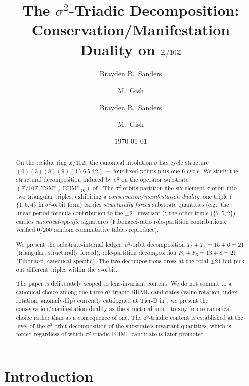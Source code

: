 \documentclass[11pt,reqno]{amsart}
\title[$\sigma^{2}$-Triadic Decomposition on $\Z/10\Z$]
{The $\sigma^{2}$-Triadic Decomposition: \\
 Conservation/Manifestation Duality on $\Z/10\Z$}
\author{Brayden R.\ Sanders \and M.\ Gish}
\author{Brayden R.\ Sanders \and M.\ Gish}
\date{\today}
\theoremstyle{plain}
\theoremstyle{definition}
\theoremstyle{remark}
\newcommand{\Z}{\mathbb{Z}}
\newcommand{\TS}{\mathrm{TSML}}
\newcommand{\BH}{\mathrm{BHML}}
\newcommand{\sig}{\sigma}
\begin{document}
\begin{abstract}
On the residue ring $\Z/10\Z$, the canonical involution $\sig$ has cycle
structure $(0)(3)(8)(9)(1\,7\,6\,5\,4\,2)$ --- four fixed points plus
one $6$-cycle. We study the structural decomposition induced by
$\sig^{2}$ on the operator substrate $(\Z/10\Z, \TS_{8}, \BH_{10})$ of
\cite{SandersGishFourCore}. The $\sig^{2}$-orbits partition the
six-element $\sig$-orbit into two triangular triples, exhibiting a
\emph{conservation/manifestation duality}: one triple
($\{1, 6, 4\}$ in $\sig^{2}$-orbit form) carries
\emph{structurally forced} substrate quantities (e.g., the linear
period-formula contribution to the $\pm 21$ invariant
\cite{SandersBridgeWP9}); the other triple ($\{7, 5, 2\}$) carries
\emph{canonical-specific} signatures (Fibonacci-ratio role-partition
contributions; verified $0/200$ random commutative tables reproduce).

We present the substrate-internal ledger: $\sig^{2}$-orbit
decomposition $T_{5} + T_{3} = 15 + 6 = 21$ (triangular, structurally
forced); role-partition decomposition $F_{7} + F_{6} = 13 + 8 = 21$
(Fibonacci, canonical-specific). The two decompositions cross at the
total $\pm 21$ but pick out different triples within the $\sig$-orbit.

The paper is deliberately scoped to lens-invariant content. We do not
commit to a canonical choice among the three σ²-triadic BHML candidates
(value-rotation, index-rotation, anomaly-flip) currently catalogued at
Tier-D in \cite{Atlas2026Tiering}; we present the conservation/manifestation
duality as the structural input to any future canonical choice rather
than as a consequence of one. The σ²-triadic content is
established at the level of the $\sig^{2}$-orbit decomposition of the
substrate's invariant quantities, which is forced regardless of which
σ²-triadic BHML candidate is later promoted.
\end{abstract}

\maketitle

\tableofcontents

\section{Introduction}
\end{document}
